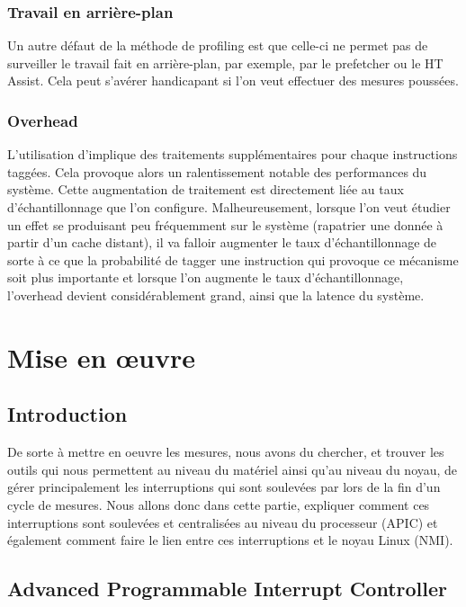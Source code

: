 					\subsubsection{Travail en arrière-plan}
						Un autre défaut de la méthode de profiling \IBS est que celle-ci ne permet pas de surveiller le travail fait en arrière-plan, par exemple, par le prefetcher ou le HT Assist. Cela peut s'avérer handicapant si l'on veut effectuer des mesures poussées.
					\subsubsection{Overhead}
						L'utilisation d'\IBS implique des traitements supplémentaires pour chaque instructions taggées. Cela provoque alors un ralentissement notable des performances du système. Cette augmentation de traitement est directement liée au taux d'échantillonnage que l'on configure. Malheureusement, lorsque l'on veut étudier un effet se produisant peu fréquemment sur le système (rapatrier une donnée à partir d'un cache distant), il va falloir augmenter le taux d'échantillonnage de sorte à ce que la probabilité de tagger une instruction qui provoque ce mécanisme soit plus importante et lorsque l'on augmente le taux d'échantillonnage, l'overhead devient considérablement grand, ainsi que la latence du système.
			\section{Mise en \oe uvre}
				\subsection{Introduction}
					De sorte à mettre en oeuvre les mesures, nous avons du chercher, et trouver les outils qui nous permettent au niveau du matériel ainsi qu'au niveau du noyau, de gérer principalement les interruptions qui sont soulevées par \IBS lors de la fin d'un cycle de mesures. Nous allons donc dans cette partie, expliquer comment ces interruptions sont soulevées et centralisées au niveau du processeur (APIC) et également comment faire le lien entre ces interruptions et le noyau Linux (NMI).
				\subsection{Advanced Programmable Interrupt Controller}
